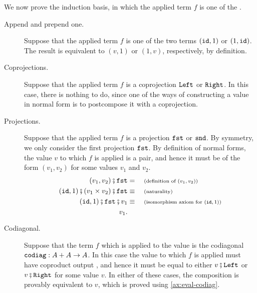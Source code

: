 We now prove the induction basis, in which the applied term $f$ is one of the .

\begin{description}
    \item[Append and prepend one.] Suppose that the applied term $f$ is one of the two terms $(\mathtt{id},1)$ or $(1,\mathtt{id})$. The result is equivalent to $(v,1)$ or $(1,v)$, respectively, by definition. 
    \item[Coprojections.] Suppose that the applied term $f$ is a coprojection $\mathtt{Left}$ or $\mathtt{Right}$. In this case, there is nothing to do, since one of the ways of constructing a value in normal form is to postcompose it with a coprojection.
    \item[Projections.] Suppose that the applied term $f$ is a projection $\mathtt{fst}$ or $\mathtt{snd}$. By symmetry, we only consider the first projection $\mathtt{fst}$. By definition of normal forms, the value $v$ to which $f$ is applied is a pair, and hence it must be of the form $(v_1,v_2)$ for some values $v_1$ and $v_2$.
\begin{align*}
    (v_1,v_2)\comp\fstterm&= \why{definition of $(v_1,v_2)$}\\
\appendoneterm\comp(v_1 \times v_2)\comp\fstterm    \equalbecause{naturality} \\
    \appendoneterm\comp\fstterm\comp{}v_1\equalbecause{isomorphism axiom for $\appendoneterm$} \\
    v_1.
\end{align*}
    \item[Codiagonal.] Suppose that the term $f$ which is applied to the value is  the codiagonal $\mathtt{codiag} : A + A \to A$. In this case the value to which $f$ is applied must have coproduct output , and hence it must be  equal to either $v\comp \leftterm$ or $v\comp \rightterm$ for some value $v$. In either of these cases, the composition is provably equivalent to $v$, which is proved  using  \cref{ax:eval-codiag}.


\end{description}
